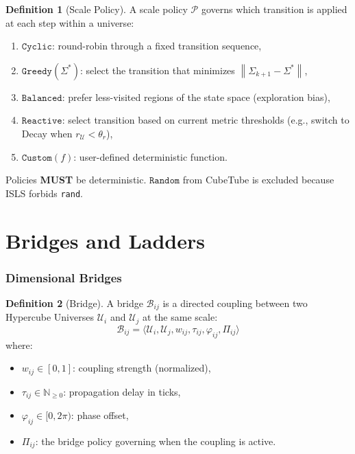 \documentclass[11pt,a4paper,twoside]{article}
\theoremstyle{definition}
\newtheorem{definition}{Definition}[section]
\theoremstyle{plain}
\theoremstyle{remark}
\newcommand{\ISLS}{\textsf{ISLS}}
\newcommand{\NN}{\mathbb{N}}
\newcommand{\calP}{\mathcal{P}}
\newcommand{\calB}{\mathcal{B}}
\newcommand{\calU}{\mathcal{U}}
\newcommand{\norm}[1]{\left\lVert #1 \right\rVert}
\begin{document}
\begin{definition}[Scale Policy]\label{def:policy}
A scale policy $\calP$ governs which transition is applied at each
step within a universe:
\begin{enumerate}[nosep,label=(\roman*)]
  \item $\mathtt{Cyclic}$: round-robin through a fixed transition
        sequence,
  \item $\mathtt{Greedy}(\Sigma^*)$: select the transition that
        minimizes $\norm{\Sigma_{k+1} - \Sigma^*}$,
  \item $\mathtt{Balanced}$: prefer less-visited regions of the
        state space (exploration bias),
  \item $\mathtt{Reactive}$: select transition based on current metric
        thresholds (e.g., switch to Decay when $r_\calU < \theta_r$),
  \item $\mathtt{Custom}(f)$: user-defined deterministic function.
\end{enumerate}
Policies \textbf{MUST} be deterministic. $\mathtt{Random}$ from
CubeTube is excluded because \ISLS{} forbids \texttt{rand}.
\end{definition}


\part{Bridges and Ladders}\label{part:bridgeladder}

\section{Dimensional Bridges}\label{sec:bridges}

\begin{definition}[Bridge]\label{def:bridge}
A bridge $\calB_{ij}$ is a directed coupling between two Hypercube
Universes $\calU_i$ and $\calU_j$ at the same scale:
\[
  \calB_{ij} = \langle \calU_i, \calU_j, w_{ij}, \tau_{ij},
               \varphi_{ij}, \Pi_{ij} \rangle
\]
where:
\begin{itemize}[nosep]
  \item $w_{ij} \in [0, 1]$: coupling strength (normalized),
  \item $\tau_{ij} \in \NN_{\ge 0}$: propagation delay in ticks,
  \item $\varphi_{ij} \in [0, 2\pi)$: phase offset,
  \item $\Pi_{ij}$: the bridge policy governing when the coupling is
        active.
\end{itemize}
\end{definition}
\end{document}

